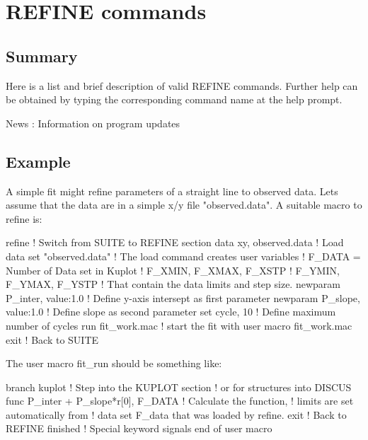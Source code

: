 \chapter{REFINE commands}
\section{Summary}
\par
Here is a list and brief description of valid REFINE commands. Further 
help can be obtained by typing the corresponding command name at the 
help prompt. 
\par
\begin{MacVerbatim}
News          : Information on program updates
\end{MacVerbatim}
\section{Example}
\par
A simple fit might refine parameters of a straight line to 
observed data. Lets assume that the data are in a simple x/y 
file "observed.data". A suitable macro to refine is: 
\par
\begin{MacVerbatim}
refine                       ! Switch from SUITE to REFINE section
data xy, observed.data       ! Load data set "observed.data"
                             ! The load command creates user variables
                             ! F_DATA = Number of Data set in Kuplot
                             ! F_XMIN, F_XMAX, F_XSTP
                             ! F_YMIN, F_YMAX, F_YSTP
                             ! That contain the data limits and step size.
newparam P_inter, value:1.0  ! Define y-axis intersept as first parameter
newparam P_slope, value:1.0  ! Define slope as second parameter
set cycle, 10                ! Define maximum number of cycles
run fit_work.mac             ! start the fit with user macro fit_work.mac
exit                         ! Back to SUITE
\end{MacVerbatim}
The user macro fit\_run should be something like: 
\par
\begin{MacVerbatim}
branch kuplot                ! Step into the KUPLOT section
                             ! or for structures into DISCUS
func P_inter + P_slope*r[0], F_DATA
                             ! Calculate the function,
                             ! limits are set automatically from
                             ! data set F_data that was loaded by refine.
exit                         ! Back to REFINE
finished                     ! Special keyword signals end of user macro
\end{MacVerbatim}

